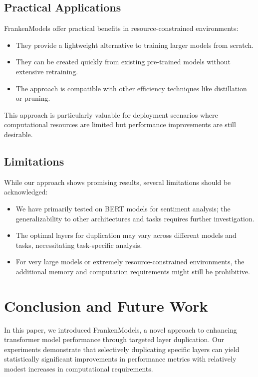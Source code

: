 \documentclass[conference]{IEEEtran}
\begin{document}
\subsection{Practical Applications}
FrankenModels offer practical benefits in resource-constrained environments:

\begin{itemize}
    \item They provide a lightweight alternative to training larger models from scratch.
    \item They can be created quickly from existing pre-trained models without extensive retraining.
    \item The approach is compatible with other efficiency techniques like distillation or pruning.
\end{itemize}

This approach is particularly valuable for deployment scenarios where computational resources are limited but performance improvements are still desirable.

\subsection{Limitations}
While our approach shows promising results, several limitations should be acknowledged:

\begin{itemize}
    \item We have primarily tested on BERT models for sentiment analysis; the generalizability to other architectures and tasks requires further investigation.
    \item The optimal layers for duplication may vary across different models and tasks, necessitating task-specific analysis.
    \item For very large models or extremely resource-constrained environments, the additional memory and computation requirements might still be prohibitive.
\end{itemize}

\section{Conclusion and Future Work}
In this paper, we introduced FrankenModels, a novel approach to enhancing transformer model performance through targeted layer duplication. Our experiments demonstrate that selectively duplicating specific layers can yield statistically significant improvements in performance metrics with relatively modest increases in computational requirements.
\end{document}
